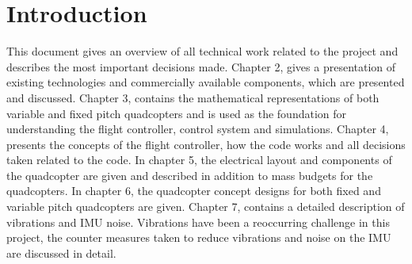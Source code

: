 \chapter{Introduction}

This document gives an overview of all technical work related to the project and describes the most important decisions made. Chapter 2, gives a presentation of existing technologies and commercially available components, which are presented and discussed. Chapter 3, contains the mathematical representations of both variable and fixed pitch quadcopters and is used as the foundation for understanding the flight controller, control system and simulations. Chapter 4, presents the concepts of the flight controller, how the code works and all decisions taken related to the code. In chapter 5, the electrical layout and components of the quadcopter are given and described in addition to mass budgets for the quadcopters. In chapter 6, the quadcopter concept designs for both fixed and variable pitch quadcopters are given. Chapter 7, contains a detailed description of vibrations and IMU noise. Vibrations have been a reoccurring challenge in this project, the counter measures taken to reduce vibrations and noise on the IMU are discussed in detail.





